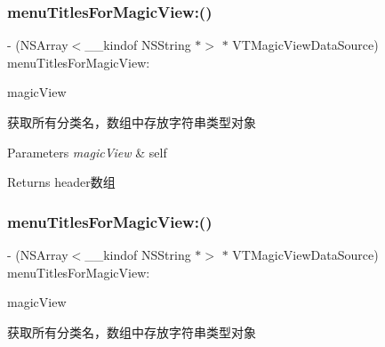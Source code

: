 \subsubsection{\texorpdfstring{menu\+Titles\+For\+Magic\+View\+:()}{menuTitlesForMagicView:()}\hspace{0.1cm}{\footnotesize\ttfamily [1/3]}}
{\footnotesize\ttfamily -\/ (N\+S\+Array$<$\+\_\+\+\_\+kindof N\+S\+String $\ast$$>$ $\ast$ V\+T\+Magic\+View\+Data\+Source) menu\+Titles\+For\+Magic\+View\+: \begin{DoxyParamCaption}\item[{(\mbox{\hyperlink{interface_v_t_magic_view}{V\+T\+Magic\+View}} $\ast$)}]{magic\+View }\end{DoxyParamCaption}}

获取所有分类名，数组中存放字符串类型对象


\begin{DoxyParams}{Parameters}
{\em magic\+View} & self\\
\hline
\end{DoxyParams}
\begin{DoxyReturn}{Returns}
header数组 
\end{DoxyReturn}
\mbox{\label{protocol_v_t_magic_view_data_source_01-p_ad8d45d2488d12e71905c23e1fa908cff}} 
\subsubsection{\texorpdfstring{menu\+Titles\+For\+Magic\+View\+:()}{menuTitlesForMagicView:()}\hspace{0.1cm}{\footnotesize\ttfamily [2/3]}}
{\footnotesize\ttfamily -\/ (N\+S\+Array$<$\+\_\+\+\_\+kindof N\+S\+String $\ast$$>$ $\ast$ V\+T\+Magic\+View\+Data\+Source) menu\+Titles\+For\+Magic\+View\+: \begin{DoxyParamCaption}\item[{(\mbox{\hyperlink{interface_v_t_magic_view}{V\+T\+Magic\+View}} $\ast$)}]{magic\+View }\end{DoxyParamCaption}}

获取所有分类名，数组中存放字符串类型对象


